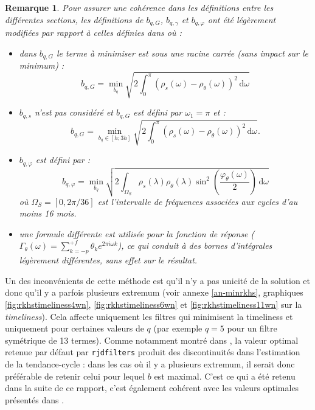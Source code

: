 \documentclass[
  11pt,
  french,
  a4paper]{article}
\newcommand\1{\mathds{1}}
\newcommand\ud{\,\mathrm{d}}
\newtheorem*{remarque}{Remarque}
\begin{document}
\begin{remarque}

Pour assurer une cohérence dans les définitions entre les différentes sections, les définitions de \(b_{q,G}\), \(b_{q,\gamma}\) et \(b_{q,\varphi}\) ont été légèrement modifiées par rapport à celles définies dans \textcite{dagumbianconcini2015new} où :

\begin{itemize}
\item
  dans \(b_{q,G}\) le terme à minimiser est sous une racine carrée (sans impact sur le minimum) :
  \[
  b_{q,G}=\underset{b_q}{\min}\sqrt{
  2\int_{0}^{\pi}
  \left(\rho_s(\omega)-\rho_\theta(\omega)\right)^{2}\ud \omega}
  \]
\item
  \(b_{q,s}\) n'est pas considéré et \(b_{q,G}\) est défini par \(\omega_1=\pi\) et :
  \[
  b_{q,G}=\underset{b_q\in[h; 3h]}{\min}
  \sqrt{2\int_{0}^{\pi}
  \left(\rho_s(\omega)-\rho_\theta(\omega)\right)^{2} \ud \omega}.
  \]
\item
  \(b_{q,\varphi}\) est défini par :
  \[
  b_{q,\varphi}=\underset{b_q}{\min}
  \sqrt{2\int_{\Omega_S}
  \rho_s(\lambda)\rho_\theta(\lambda)\sin^{2}\left(\frac{\varphi_\theta(\omega)}{2}\right)\ud \omega}
  \]
  où \(\Omega_S=[0,2\pi/36]\) est l'intervalle de fréquences associées aux cycles d'au moins 16 mois.
\item
  une formule différente est utilisée pour la fonction de réponse (\(\Gamma_\theta(\omega)=\sum_{k=-p}^{+f} \theta_k e^{2\pi i \omega k}\)), ce qui conduit à des bornes d'intégrales légèrement différentes, sans effet sur le résultat.
\end{itemize}

\end{remarque}

Un des inconvénients de cette méthode est qu'il n'y a pas unicité de la solution et donc qu'il y a parfois plusieurs extremum (voir annexe \ref{an-minrkhs}, graphiques \ref{fig:rkhstimeliness4wn}, \ref{fig:rkhstimeliness6wn} et \ref{fig:rkhstimeliness11wn} sur la \emph{timeliness}).
Cela affecte uniquement les filtres qui minimisent la timeliness et uniquement pour certaines valeurs de \(q\) (par exemple \(q=5\) pour un filtre symétrique de 13 termes).
Comme notamment montré dans \textcite{JSM2021AQLTLQ}, la valeur optimal retenue par défaut par \texttt{rjdfilters} produit des discontinuités dans l'estimation de la tendance-cycle : dans les cas où il y a plusieurs extremum, il serait donc préférable de retenir celui pour lequel \(b\) est maximal.
C'est ce qui a été retenu dans la suite de ce rapport, c'est également cohérent avec les valeurs optimales présentés dans \textcite{dagumbianconcini2015new}.
\end{document}
